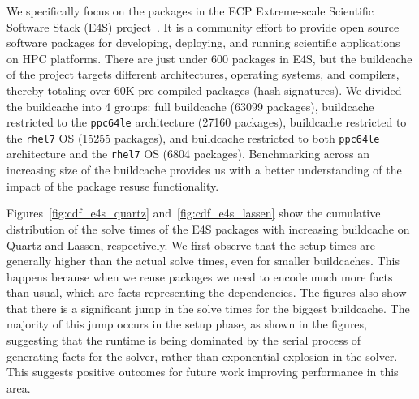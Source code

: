 We specifically focus on the packages in the ECP Extreme-scale Scientific Software Stack (E4S) project~\cite{e4s}. It is a community effort to provide open source software packages for developing, deploying, and running scientific applications on HPC platforms. There are just under 600 packages in E4S, but the buildcache of the project targets different architectures, operating systems, and compilers, thereby totaling over 60K pre-compiled packages (hash signatures). We divided the buildcache into 4 groups: full buildcache (63099 packages), buildcache restricted to the \texttt{ppc64le} architecture (27160 packages), buildcache restricted to the \texttt{rhel7} OS (15255 packages), and buildcache restricted to both \texttt{ppc64le} architecture and the \texttt{rhel7} OS (6804 packages). Benchmarking across an increasing size of the buildcache provides us with a better understanding of the impact of the package resuse functionality.

Figures~\ref{fig:cdf_e4s_quartz} and~\ref{fig:cdf_e4s_lassen} show the cumulative distribution of the solve times of the E4S packages with increasing buildcache on Quartz and Lassen, respectively. We first observe that the setup times are generally higher than the actual solve times, even for smaller buildcaches. This happens because when we reuse packages we need to encode much more facts than usual, which are facts representing the dependencies. The figures also show that there is a significant jump in the solve times for the biggest buildcache. The majority of this jump occurs in the setup phase, as shown in the figures, suggesting that the runtime is being dominated by the serial process of generating facts for the solver, rather than exponential explosion in the solver. This suggests positive outcomes for future work improving performance in this area.
